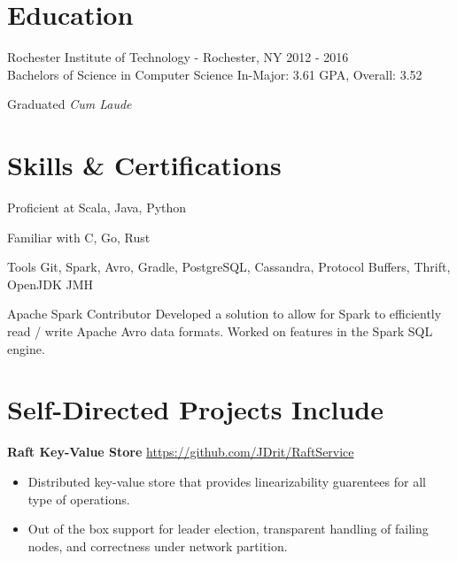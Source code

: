 \documentclass[overlapped,line]{resume}
\newcommand{\rurl}[1]{\hfill {\footnotesize \url{#1}}}
\begin{document}
\begin{resume}
\section{\mysidestyle Education}

  \begin{compactdesc}
    \item[Rochester Institute of Technology] - Rochester, NY \hfill {2012 - 2016} \\
      Bachelors of Science in Computer Science \hfill {In-Major: 3.61 GPA, Overall: 3.52} \\
      \vspace{-4mm}
      \begin{flushright} Graduated \textit{Cum Laude} \end{flushright}
  \end{compactdesc}
  \vspace{-6mm}
  
\section{\mysidestyle Skills \& Certifications}

  \begin{compactdesc}
  \item[Proficient at] \small Scala, Java, Python
  \item[Familiar with] \small C, Go, Rust
  \item[Tools] \small Git, Spark, Avro, Gradle, PostgreSQL, Cassandra, Protocol Buffers, Thrift,
    OpenJDK JMH
  \item[Apache Spark Contributor] Developed a solution to allow for Spark to efficiently read /
    write Apache Avro data formats. Worked on features in the Spark SQL engine.
  \end{compactdesc}

\section{\mysidestyle Self-Directed Projects Include}

  \textbf{Raft Key-Value Store} \rurl{https://github.com/JDrit/RaftService}
  \begin{itemize}
    \item Distributed key-value store that provides linearizability guarentees for all type of
      operations.
    \item Out of the box support for leader election, transparent handling of failing nodes, and
      correctness under network partition.
  \end{itemize}


\end{resume}
\end{document}
